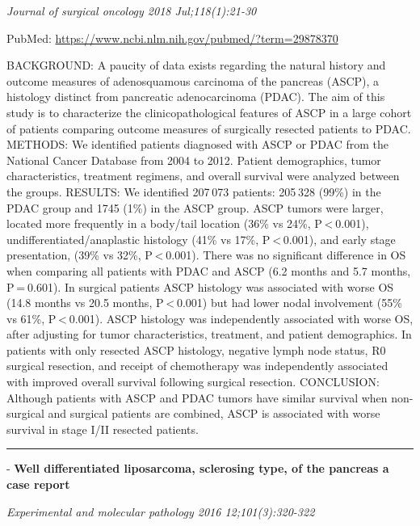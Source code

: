 \documentclass[]{article}
\begin{document}
\emph{Journal of surgical oncology 2018 Jul;118(1):21-30}

PubMed: \url{https://www.ncbi.nlm.nih.gov/pubmed/?term=29878370}

BACKGROUND: A paucity of data exists regarding the natural history and
outcome measures of adenosquamous carcinoma of the pancreas (ASCP), a
histology distinct from pancreatic adenocarcinoma (PDAC). The aim of
this study is to characterize the clinicopathological features of ASCP
in a large cohort of patients comparing outcome measures of surgically
resected patients to PDAC. METHODS: We identified patients diagnosed
with ASCP or PDAC from the National Cancer Database from 2004 to 2012.
Patient demographics, tumor characteristics, treatment regimens, and
overall survival were analyzed between the groups. RESULTS: We
identified 207 073 patients: 205 328 (99\%) in the PDAC group and 1745
(1\%) in the ASCP group. ASCP tumors were larger, located more
frequently in a body/tail location (36\% vs 24\%, P \textless{} 0.001),
undifferentiated/anaplastic histology (41\% vs 17\%,
P \textless{} 0.001), and early stage presentation, (39\% vs 32\%,
P \textless{} 0.001). There was no significant difference in OS when
comparing all patients with PDAC and ASCP (6.2 months and 5.7 months,
P = 0.601). In surgical patients ASCP histology was associated with
worse OS (14.8 months vs 20.5 months, P \textless{} 0.001) but had lower
nodal involvement (55\% vs 61\%, P \textless{} 0.001). ASCP histology
was independently associated with worse OS, after adjusting for tumor
characteristics, treatment, and patient demographics. In patients with
only resected ASCP histology, negative lymph node status, R0 surgical
resection, and receipt of chemotherapy was independently associated with
improved overall survival following surgical resection. CONCLUSION:
Although patients with ASCP and PDAC tumors have similar survival when
non-surgical and surgical patients are combined, ASCP is associated with
worse survival in stage I/II resected patients.

{}

{}

\begin{center}\rule{0.5\linewidth}{\linethickness}\end{center}

 - \textbf{Well differentiated liposarcoma, sclerosing type, of the
pancreas a case report}

\emph{Experimental and molecular pathology 2016 12;101(3):320-322}
\end{document}
